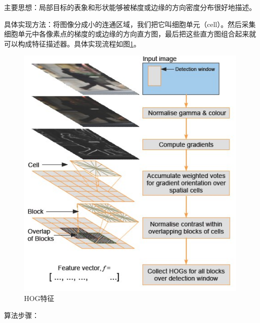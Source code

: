 \documentclass[12pt]{article}
\begin{document}
{\color{blue}主要思想}：局部目标的表象和形状能够被梯度或边缘的方向密度分布很好地描述。

{\color{blue}具体实现方法}：将图像分成小的连通区域，我们把它叫细胞单元（cell）。然后采集细胞单元中各像素点的梯度的或边缘的方向直方图，最后把这些直方图组合起来就可以构成特征描述器。具体实现流程如图\ref{fig:shixian}。
        \begin{figure}
            \centering
            \includegraphics[width=0.4\linewidth]{flowchart}
            \caption{HOG特征}
            \label{fig:shixian}
        \end{figure}

{\color{blue}算法步骤}：
\end{document}

